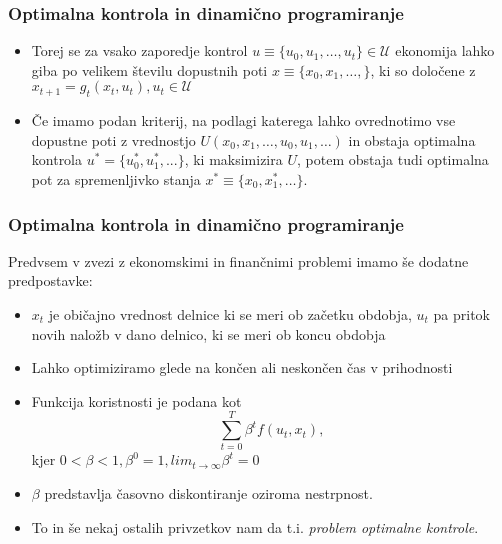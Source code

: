 \documentclass{beamer}
\begin{document}
\begin{frame}
\frametitle{Optimalna kontrola in dinamično programiranje}

\begin{itemize}
\item Torej se za vsako zaporedje kontrol $u \equiv \{u_0, u_1, \ldots, u_t\} \in \mathcal{U}$ ekonomija lahko giba po velikem številu dopustnih poti $x \equiv \{ x_0, x_1, \ldots, \}$, ki so določene z $x_{t+1} = g_t(x_t,u_t), u_t \in \mathcal{U}$ \newline
\item Če imamo podan kriterij, na podlagi katerega lahko ovrednotimo vse dopustne poti z vrednostjo $U(x_0, x_1, \ldots , u_0, u_1, \ldots)$ in obstaja optimalna kontrola $u^* = \{u_0^*, u_1^*, ...\}$, ki maksimizira $U$, potem obstaja tudi optimalna pot za spremenljivko stanja $x^* \equiv \{x_0, x_1^*,  \ldots \}$.

\end{itemize}

\end{frame}

\begin{frame}
\frametitle{Optimalna kontrola in dinamično programiranje}

Predvsem v zvezi z ekonomskimi in finančnimi problemi imamo še dodatne predpostavke:

\begin{itemize}
\item $x_t$ je običajno vrednost delnice ki se meri ob začetku obdobja, $u_t$ pa pritok novih naložb v dano delnico, ki se meri ob koncu obdobja
\item Lahko optimiziramo glede na končen ali neskončen čas v prihodnosti
\item Funkcija koristnosti je podana kot 
\begin{equation} 
\sum_{t=0}^T \beta^t f(u_t, x_t),
\end{equation}
kjer $0 < \beta < 1, \beta^0 = 1, lim_{t\to\infty} \beta^t = 0$
\item $\beta$ predstavlja časovno diskontiranje oziroma nestrpnost.
\item To in še nekaj ostalih privzetkov nam da t.i. \textit{problem optimalne kontrole}.
\end{itemize}

\end{frame}
\end{document}
